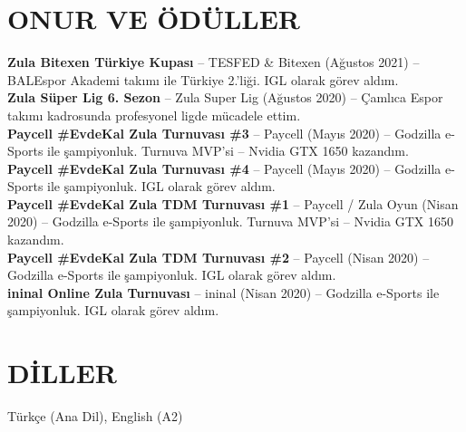 \documentclass[a4paper,8pt]{article}
\begin{document}
\section{ONUR VE ÖDÜLLER}
{\small
\textbf{Zula Bitexen Türkiye Kupası} -- TESFED \& Bitexen (Ağustos 2021) -- BALEspor Akademi takımı ile Türkiye 2.'liği. IGL olarak görev aldım.\\
\textbf{Zula Süper Lig 6. Sezon} -- Zula Super Lig (Ağustos 2020) -- Çamlıca Espor takımı kadrosunda profesyonel ligde mücadele ettim.\\
\textbf{Paycell \#EvdeKal Zula Turnuvası \#3} -- Paycell (Mayıs 2020) -- Godzilla e-Sports ile şampiyonluk. Turnuva MVP'si -- Nvidia GTX 1650 kazandım.\\
\textbf{Paycell \#EvdeKal Zula Turnuvası \#4} -- Paycell (Mayıs 2020) -- Godzilla e-Sports ile şampiyonluk. IGL olarak görev aldım.\\
\textbf{Paycell \#EvdeKal Zula TDM Turnuvası \#1} -- Paycell / Zula Oyun (Nisan 2020) -- Godzilla e-Sports ile şampiyonluk. Turnuva MVP'si -- Nvidia GTX 1650 kazandım.\\
\textbf{Paycell \#EvdeKal Zula TDM Turnuvası \#2} -- Paycell (Nisan 2020) -- Godzilla e-Sports ile şampiyonluk. IGL olarak görev aldım.\\
\textbf{ininal Online Zula Turnuvası} -- ininal (Nisan 2020) -- Godzilla e-Sports ile şampiyonluk. IGL olarak görev aldım.
}

\section{DİLLER}
{\small Türkçe (Ana Dil), English (A2)}
\end{document}
